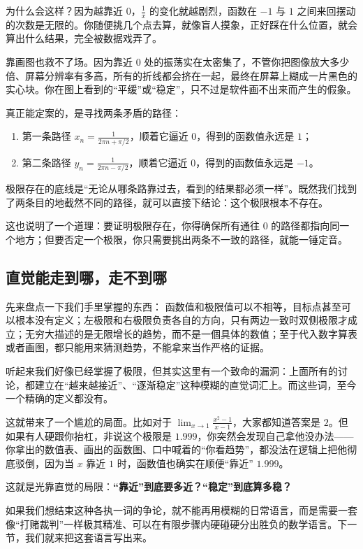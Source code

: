为什么会这样？因为越靠近 \(0\)，\(\frac{1}{x}\) 的变化就越剧烈，函数在 \(-1\) 与 \(1\) 之间来回摆动的次数是无限的。你随便挑几个点去算，就像盲人摸象，正好踩在什么位置，就会算出什么结果，完全被数据戏弄了。

靠画图也救不了场。因为靠近 \(0\) 处的振荡实在太密集了，不管你把图像放大多少倍、屏幕分辨率有多高，所有的折线都会挤在一起，最终在屏幕上糊成一片黑色的实心块。你在图上看到的``平缓''或``稳定''，只不过是软件画不出来而产生的假象。

真正能定案的，是寻找两条矛盾的路径：

\begin{enumerate}
  \item 第一条路径 \(x_n=\frac{1}{2\pi n+\pi/2}\)，顺着它逼近 \(0\)，得到的函数值永远是 \(1\)；
  \item 第二条路径 \(y_n=\frac{1}{2\pi n-\pi/2}\)，顺着它逼近 \(0\)，得到的函数值永远是 \(-1\)。
\end{enumerate}

极限存在的底线是``无论从哪条路靠过去，看到的结果都必须一样''。既然我们找到了两条目的地截然不同的路径，就可以直接下结论：这个极限根本不存在。

这也说明了一个道理：要证明极限存在，你得确保所有通往 \(0\) 的路径都指向同一个地方；但要否定一个极限，你只需要挑出两条不一致的路径，就能一锤定音。



\subsection{直觉能走到哪，走不到哪}

先来盘点一下我们手里掌握的东西：
函数值和极限值可以不相等，目标点甚至可以根本没有定义；左极限和右极限负责各自的方向，只有两边一致时双侧极限才成立；无穷大描述的是无限增长的趋势，而不是一個具体的数值；至于代入数字算表或者画图，都只能用来猜测趋势，不能拿来当作严格的证据。

听起来我们好像已经掌握了极限，但其实这里有一个致命的漏洞：上面所有的讨论，都建立在``越来越接近''、``逐渐稳定''这种模糊的直觉词汇上。而这些词，至今一个精确的定义都没有。

这就带来了一个尴尬的局面。比如对于 \(\lim_{x\to1}\frac{x^2-1}{x-1}\)，大家都知道答案是 \(2\)。但如果有人硬跟你抬杠，非说这个极限是 \(1.999\)，你突然会发现自己拿他没办法——你拿出的数值表、画出的函数图、口中喊着的``你看趋势''，都没法在逻辑上把他彻底驳倒，因为当 \(x\) 靠近 \(1\) 时，函数值也确实在顺便``靠近'' \(1.999\)。

这就是光靠直觉的局限：\textbf{``靠近''到底要多近？``稳定''到底算多稳？}

如果我们想结束这种各执一词的争论，就不能再用模糊的日常语言，而是需要一套像``打赌裁判''一样极其精准、可以在有限步骤内硬碰硬分出胜负的数学语言。下一节，我们就来把这套语言写出来。